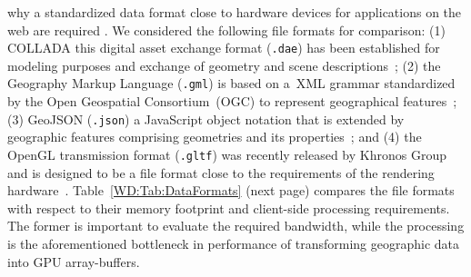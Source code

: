       why a standardized data format close to hardware devices for applications on the
      web are required \cite{Coughlin2014,Trevett2012}. We considered the following file
      formats for comparison: (1) COLLADA this digital
      asset exchange format (\texttt{.dae}) has been established for modeling purposes
      and exchange of geometry and scene descriptions~\cite{Barnes2008}; (2) the Geography
      Markup Language (\texttt{.gml}) is based on a~XML grammar standardized by the Open
      Geospatial Consortium~(OGC) to represent geographical features~\cite{GML2007}; (3)
      GeoJSON (\texttt{.json}) a JavaScript object notation that is extended by geographic
      features comprising geometries and its properties~\cite{Butler2008}; and (4) the
      OpenGL transmission format (\texttt{.gltf}) was recently released by Khronos Group
      and is designed to be a file format close to the requirements of the rendering
      hardware~\cite{Cozzi2015}. Table~\ref{WD:Tab:DataFormats} (next page) compares
      the file formats with respect to their memory footprint and client-side processing
      requirements. The former is important to evaluate the required bandwidth, while
      the processing is the aforementioned bottleneck in performance of transforming
      geographic data into GPU array-buffers.

